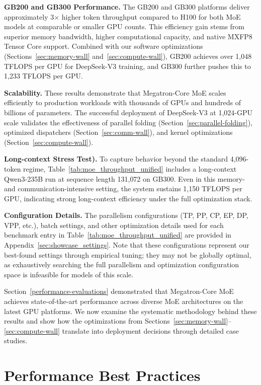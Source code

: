 \textbf{GB200 and GB300 Performance.}
The GB200 and GB300 platforms deliver approximately 3$\times$ higher token throughput compared to H100 for both MoE models at comparable or smaller GPU counts. This efficiency gain stems from superior memory bandwidth, higher computational capacity, and native MXFP8 Tensor Core support. Combined with our software optimizations (Sections~\ref{sec:memory-wall} and~\ref{sec:compute-wall}), GB200 achieves over 1,048 TFLOPS per GPU for DeepSeek-V3 training, and GB300 further pushes this to 1,233 TFLOPS per GPU.

\textbf{Scalability.}
These results demonstrate that Megatron-Core MoE scales efficiently to production workloads with thousands of GPUs and hundreds of billions of parameters. The successful deployment of DeepSeek-V3 at 1,024-GPU scale validates the effectiveness of parallel folding (Section~\ref{sec:parallel-folding}), optimized dispatchers (Section~\ref{sec:comm-wall}), and kernel optimizations (Section~\ref{sec:compute-wall}).

\textbf{Long-context Stress Test).}
To capture behavior beyond the standard 4{,}096-token regime, Table~\ref{tab:moe_throughput_unified} includes a long-context Qwen3-235B run at sequence length 131{,}072 on GB300. Even in this memory- and communication-intensive setting, the system sustains 1{,}150 TFLOPS per GPU, indicating strong long-context efficiency under the full optimization stack.

\noindent
\textbf{Configuration Details.} The parallelism configurations (TP, PP, CP, EP, DP, VPP, etc.), batch settings, and other optimization details used for each benchmark entry in Table~\ref{tab:moe_throughput_unified} are provided in Appendix~\ref{sec:showcase_settings}. Note that these configurations represent our best-found settings through empirical tuning; they may not be globally optimal, as exhaustively searching the full parallelism and optimization configuration space is infeasible for models of this scale.

Section~\ref{performance-evaluations} demonstrated that Megatron-Core MoE achieves state-of-the-art performance across diverse MoE architectures on the latest GPU platforms. We now examine the systematic methodology behind these results and show how the optimizations from Sections~\ref{sec:memory-wall}--\ref{sec:compute-wall} translate into deployment decisions through detailed case studies.

\section{Performance Best Practices}\label{sec:best-practices}

